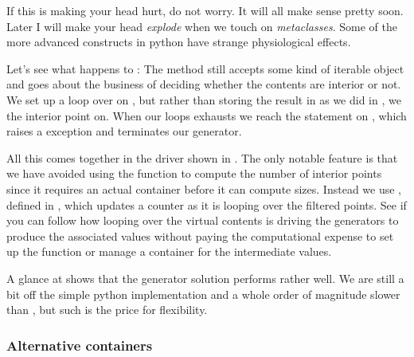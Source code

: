 If this is making your head hurt, do not worry. It will all make sense pretty soon. Later I
will make your head {\em explode} when we touch on {\em metaclasses}. Some of the more advanced
constructs in python have strange physiological effects\supercite{guido}.

Let's see what happens to :
%
%
The method  still accepts some kind of iterable object  and
goes about the business of deciding whether the contents are interior or not. We set up a loop
over  on , but rather than storing the
result in  as we did in , we 
the interior point on.  When our loops exhausts
 we reach the  statement on
, which raises a  exception and
terminates our generator.

All this comes together in the driver shown in . The only notable
feature is that we have avoided using the function  to compute the number of
interior points since it requires an actual container before it can compute sizes. Instead we
use , defined in , which updates a counter
as it is looping over the filtered points. See if you can follow how looping over the virtual
contents is driving the generators to produce the associated values without paying the
computational expense to set up the function or manage a container for the intermediate values.
%

A glance at  shows that the generator solution performs rather well. We
are still a bit off the simple python implementation and a whole order of magnitude slower than
\cpp, but such is the price for flexibility.

\subsubsection{Alternative containers}
\label{sec:classes:alternatives}

